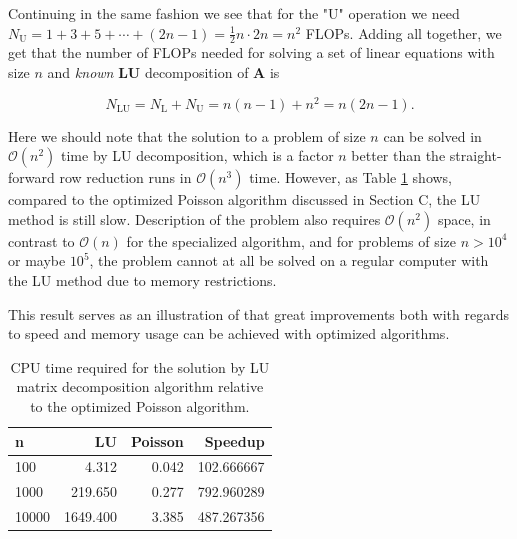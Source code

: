 \documentclass[]{article}
\begin{document}
Continuing in the same fashion we see that for the "U" operation we need $N_{\text{U}} = 1+3+5+\cdots+(2n-1) = \frac{1}{2}n \cdot 2n = n^2$ FLOPs. Adding all together, we get that the number of FLOPs needed for solving a set of linear equations with size $n$ and \textit{known} $\mathbf{LU}$ decomposition of $\mathbf{A}$ is

\begin{equation*}
N_{\text{LU}} = N_{\text{L}} + N_{\text{U}} = n(n-1) + n^2 = n(2n-1) \text{.}
\end{equation*}

Here we should note that the solution to a problem of size $n$ can be solved in $\mathcal{O}(n^2)$ time by LU decomposition, which is a factor $n$ better than the straight-forward row reduction runs in $\mathcal{O}(n^3)$ time. However, as Table \ref{tab:lu} shows, compared to the optimized Poisson algorithm discussed in Section C, the LU method is still slow. Description of the problem also requires $\mathcal{O}(n^2)$ space, in contrast to $\mathcal{O}(n)$ for the specialized algorithm, and for problems of size $n > 10^4$ or maybe $10^5$, the problem cannot at all be solved on a regular computer with the LU method due to memory restrictions.

This result serves as an illustration of that great improvements both with regards to speed and memory usage can be achieved with optimized algorithms.

\begin{table}[ht]
\caption{CPU time required for the solution by LU matrix decomposition algorithm relative to the optimized Poisson algorithm.}
\label{tab:lu}
\begin{center}
\begin{tabular}{lrrr}
	\toprule
	n &        LU &  Poisson &     Speedup \\
	\midrule
	100     &     4.312 &    0.042 &  102.666667 \\
	1000    &   219.650 &    0.277 &  792.960289 \\
	10000   &  1649.400 &    3.385 &  487.267356 \\
	\bottomrule
\end{tabular}
\end{center}
\end{table}
\end{document}
